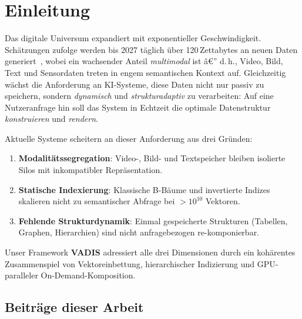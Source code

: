 ﻿\documentclass[12pt,a4paper]{article}
\begin{document}
\tableofcontents
\newpage

\section{Einleitung}
\label{sec:einleitung}

Das digitale Universum expandiert mit exponentieller Geschwindigkeit. 
Schätzungen zufolge werden bis 2027 täglich über 120\,Zettabytes an 
neuen Daten generiert~\cite{idc2024}, wobei ein wachsender Anteil 
\emph{multimodal} ist â€” d.\,h., Video, Bild, Text und Sensordaten 
treten in engem semantischen Kontext auf. Gleichzeitig wächst die 
Anforderung an KI-Systeme, diese Daten nicht nur passiv zu speichern, 
sondern \emph{dynamisch} und \emph{strukturadaptiv} zu verarbeiten: 
Auf eine Nutzeranfrage hin soll das System in Echtzeit die optimale 
Datenstruktur \emph{konstruieren} und \emph{rendern}.

Aktuelle Systeme scheitern an dieser Anforderung aus drei Gründen:

\begin{enumerate}[leftmargin=1.2em, itemsep=0pt, topsep=2pt]
  \item \textbf{Modalitätssegregation}: Video-, Bild- und Textspeicher 
        bleiben isolierte Silos mit inkompatibler Repräsentation.
  \item \textbf{Statische Indexierung}: Klassische B-Bäume und 
        invertierte Indizes skalieren nicht zu semantischer Abfrage 
        bei $>10^{10}$ Vektoren.
  \item \textbf{Fehlende Strukturdynamik}: Einmal gespeicherte 
        Strukturen (Tabellen, Graphen, Hierarchien) sind nicht 
        anfragebezogen re-komponierbar.
\end{enumerate}

Unser Framework \textbf{VADIS} adressiert alle drei Dimensionen durch 
ein kohärentes Zusammenspiel von Vektoreinbettung, hierarchischer 
Indizierung und GPU-paralleler On-De\-mand-Komposition.

\subsection{Beiträge dieser Arbeit}
\end{document}
